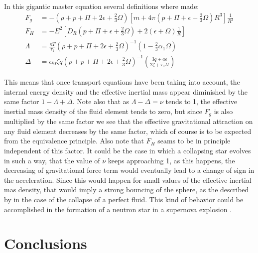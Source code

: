 In this gigantic master equation several definitions where made:
\begin{align}
	F_g &= -\left(\rho + p + \Pi + 2\epsilon + \frac{2}{3}\Omega\right)\left[m + 4\pi \left(p+\Pi + \epsilon + \frac{2}{3}\Omega\right)R^3\right]\frac{1}{R^2} \\
	F_H &= -E^2 \left[D_R\left(p + \Pi + \epsilon + \frac{2}{3}\Omega \right) + 2(\epsilon + \Omega)\frac{1}{R}\right] \\
	\Lambda &=  \frac{\kappa T}{\tau_1}\left(\rho + p + \Pi + 2\epsilon + \frac{2}{3}\Omega \right)^{-1} \left(1 - \frac{2}{3}\alpha_1 \Omega\right) \\
	\Delta &= \alpha_0 \zeta q\left(\rho + p + \Pi + 2\epsilon + \frac{2}{3}\Omega\right)^{-1}\left(\frac{3q + a \epsilon}{2\zeta + \tau_0 \Pi}\right)
\end{align}

This means that once transport equations have been taking into account, the internal energy density and the effective inertial mass appear diminished by the same factor $1 - \Lambda + \Delta$. Note also that as $\Lambda - \Delta = \nu $ tends to 1, the effective inertial mass density of the fluid element tends to zero, but since $F_g$ is also multiplied by the same factor we see that the effective gravitational attraction on any fluid element decreases by the same factor, which of course is to be expected from the equivalence principle. Also note that $F_H$ seams to be in principle independent of this factor. It could be the case in which a collapsing star evolves in such a way, that the value of $\nu$ keeps approaching 1, as this happens, the decreasing of gravitational force term would eventually lead to a change of sign in the acceleration. Since this would happen for small values of the effective inertial mas density, that would imply a strong bouncing of the sphere, as the described by \cite{may1966hydrodynamic} in the case of the collapse of a perfect fluid. This kind of behavior could be accomplished in the formation of a neutron star in a supernova explosion \cite{herrera2004dynamics}.

\section{Conclusions}

